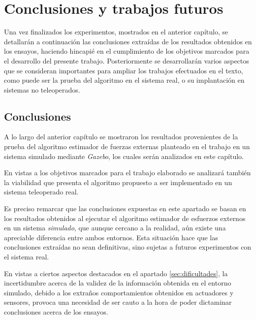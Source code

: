 \chapter{Conclusiones y trabajos futuros}

Una vez finalizados los experimentos, mostrados en el anterior capítulo, se detallarán a continuación las conclusiones extraídas de los resultados obtenidos en los ensayos, haciendo hincapié en el cumplimiento de los objetivos marcados para el desarrollo del presente trabajo. Posteriormente se desarrollarán varios aspectos que se consideran importantes para ampliar los trabajos efectuados en el texto, como puede ser la prueba del algoritmo en el sistema real, o su implantación en sistemas no teleoperados. \par 

\newpage
\section{Conclusiones}

A lo largo del anterior capítulo se mostraron los resultados provenientes de la prueba del algoritmo estimador de fuerzas externas planteado en el trabajo en un sistema simulado mediante \emph{Gazebo}, los cuales serán analizados en este capítulo. \par 

En vistas a los objetivos marcados para el trabajo elaborado se analizará también la viabilidad que presenta el algoritmo propuesto a ser implementado en un sistema teleoperado real. \par 

Es preciso remarcar que las conclusiones expuestas en este apartado se basan en los resultados obtenidos al ejecutar el algoritmo estimador de esfuerzos externos en un sistema \emph{simulado}, que aunque cercano a la realidad, aún existe una apreciable diferencia entre ambos entornos. Esta situación hace que las conclusiones extraídas no sean definitivas, sino sujetas a futuros experimentos con el sistema real. \par

En vistas a ciertos aspectos destacados en el apartado \ref{sec:dificultades}, la incertidumbre acerca de la validez de la información obtenida en el entorno simulado, debido a los extraños comportamientos obtenidos en actuadores y sensores, provoca una necesidad de ser cauto a la hora de poder dictaminar conclusiones acerca de los ensayos. \par 

